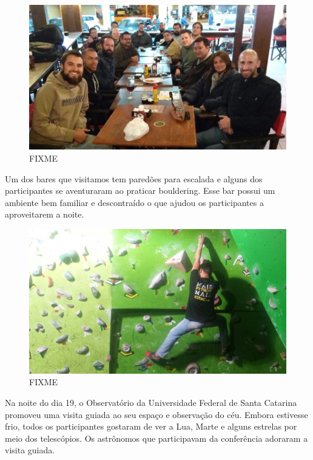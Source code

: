 \documentclass[12pt]{article}
\begin{document}
\begin{figure}[!htb]
\center
\includegraphics[height=.3\textheight]{social-viking.jpg}
\caption{FIXME}
\end{figure}

Um dos bares que visitamos tem paredões para escalada
e alguns dos participantes se aventuraram ao praticar bouldering.
Esse bar possui um ambiente bem familiar e descontraído
o que ajudou os participantes a aproveitarem a noite.

\begin{figure}[!htb]
\center
\includegraphics[height=.3\textheight]{python-escala.jpg}
\caption{FIXME}
\end{figure}

Na noite do dia 19, o Observatório da Universidade Federal de Santa Catarina
promoveu uma visita guiada ao seu espaço e observação do céu.
Embora estivesse frio, todos os participantes gostaram de ver a Lua, Marte e
alguns estrelas por meio dos telescópios.
Os astrônomos que participavam da conferência adoraram a visita guiada.
\end{document}
